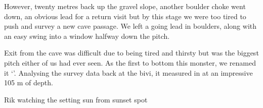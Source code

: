 However, twenty metres back up the gravel slope, another boulder choke
went down, an obvious lead for a return visit but by this stage we were
too tired to push and survey a new cave passage. We left a going lead in
boulders, along with an easy swing into a window halfway down the pitch.

Exit from the cave was difficult due to being tired and thirsty but   was the biggest pitch either of us had ever seen. As the first to bottom
this monster, we renamed it `'. Analysing the survey data back at the bivi, it measured in at an
impressive 105 m of depth.


\begin{pagefigure}
      \checkoddpage \ifoddpage \forcerectofloat \else \forceversofloat \fi
      \centering
  \caption{Rik watching the setting sun from sunset spot }
\end{pagefigure}
